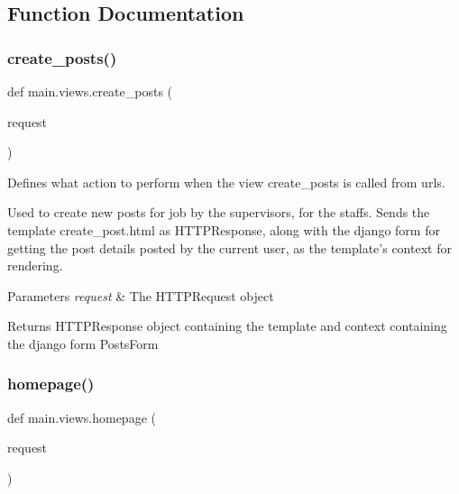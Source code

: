 \subsection{Function Documentation}
\mbox{\label{namespacemain_1_1views_a5188f01b8c7ed850b1f946afb34d183a}} 
\subsubsection{\texorpdfstring{create\+\_\+posts()}{create\_posts()}}
{\footnotesize\ttfamily def main.\+views.\+create\+\_\+posts (\begin{DoxyParamCaption}\item[{}]{request }\end{DoxyParamCaption})}



Defines what action to perform when the view \textquotesingle{}create\+\_\+posts\textquotesingle{} is called from urls. 

Used to create new posts for job by the supervisors, for the staffs. Sends the template create\+\_\+post.\+html as H\+T\+T\+P\+Response, along with the django form for getting the post details posted by the current user, as the template’s context for rendering. 
\begin{DoxyParams}{Parameters}
{\em request} & The H\+T\+T\+P\+Request object \\
\hline
\end{DoxyParams}
\begin{DoxyReturn}{Returns}
H\+T\+T\+P\+Response object containing the template and context containing the django form Posts\+Form 
\end{DoxyReturn}
\mbox{\label{namespacemain_1_1views_a65a9dba6e3878ee1da013593b60345d4}} 
\subsubsection{\texorpdfstring{homepage()}{homepage()}}
{\footnotesize\ttfamily def main.\+views.\+homepage (\begin{DoxyParamCaption}\item[{}]{request }\end{DoxyParamCaption})}



